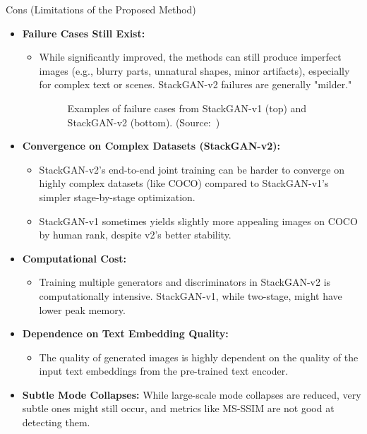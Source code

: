\documentclass{beamer}
\newcommand{\paperfigure}[3][width=\textwidth]{%
    \begin{figure}%
        \centering%
        \caption{#3 (Source:~\cite{stackgan++})}%
        \label{fig:#2}%
    \end{figure}%
}
\begin{document}
\begin{frame}{Cons (Limitations of the Proposed Method)}
    \begin{itemize}
        \item \textbf{Failure Cases Still Exist:}
            \begin{itemize}
                \item While significantly improved, the methods can still produce imperfect images (e.g., blurry parts, unnatural shapes, minor artifacts), especially for complex text or scenes. StackGAN-v2 failures are generally "milder."
                \paperfigure[height=0.25\textheight]{fig9_failure_cases}{Examples of failure cases from StackGAN-v1 (top) and StackGAN-v2 (bottom).}
            \end{itemize}
        \item \textbf{Convergence on Complex Datasets (StackGAN-v2):}
            \begin{itemize}
                \item StackGAN-v2's end-to-end joint training can be harder to converge on highly complex datasets (like COCO) compared to StackGAN-v1's simpler stage-by-stage optimization.
                \item StackGAN-v1 sometimes yields slightly more appealing images on COCO by human rank, despite v2's better stability.
            \end{itemize}
        \item \textbf{Computational Cost:}
            \begin{itemize}
                \item Training multiple generators and discriminators in StackGAN-v2 is computationally intensive. StackGAN-v1, while two-stage, might have lower peak memory.
            \end{itemize}
        \item \textbf{Dependence on Text Embedding Quality:}
            \begin{itemize}
                \item The quality of generated images is highly dependent on the quality of the input text embeddings from the pre-trained text encoder.
            \end{itemize}
        \item \textbf{Subtle Mode Collapses:} While large-scale mode collapses are reduced, very subtle ones might still occur, and metrics like MS-SSIM are not good at detecting them.
    \end{itemize}
\end{frame}
\end{document}
